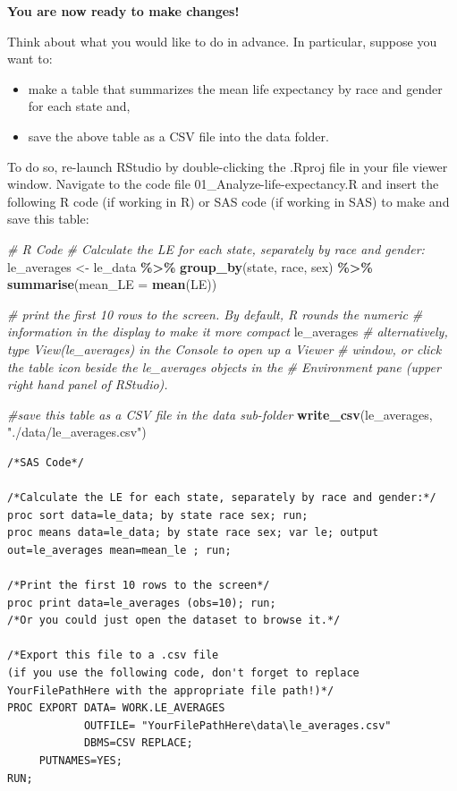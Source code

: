 \documentclass[
]{book}
\newenvironment{Shaded}{\begin{snugshade}}{\end{snugshade}}
\newcommand{\AttributeTok}[1]{\textcolor[rgb]{0.13,0.29,0.53}{#1}}
\newcommand{\CommentTok}[1]{\textcolor[rgb]{0.56,0.35,0.01}{\textit{#1}}}
\newcommand{\FunctionTok}[1]{\textcolor[rgb]{0.13,0.29,0.53}{\textbf{#1}}}
\newcommand{\NormalTok}[1]{#1}
\newcommand{\OtherTok}[1]{\textcolor[rgb]{0.56,0.35,0.01}{#1}}
\newcommand{\SpecialCharTok}[1]{\textcolor[rgb]{0.81,0.36,0.00}{\textbf{#1}}}
\newcommand{\StringTok}[1]{\textcolor[rgb]{0.31,0.60,0.02}{#1}}
\providecommand{\tightlist}{%
  \setlength{\itemsep}{0pt}\setlength{\parskip}{0pt}}
\begin{document}
\textbf{You are now ready to make changes!}

Think about what you would like to do in advance. In particular, suppose you
want to:

\begin{itemize}
\tightlist
\item
  make a table that summarizes the mean life expectancy by race and
  gender for each state and,
\item
  save the above table as a CSV file into the data folder.
\end{itemize}

To do so, re-launch RStudio by double-clicking the .Rproj file in your file viewer
window. Navigate to the code file 01\_Analyze-life-expectancy.R and insert the
following R code (if working in R) or SAS code (if working in SAS) to make and save this table:

\begin{Shaded}
\begin{Highlighting}[]
\CommentTok{\# R Code}
\CommentTok{\# Calculate the LE for each state, separately by race and gender:}
\NormalTok{le\_averages }\OtherTok{\textless{}{-}}\NormalTok{ le\_data }\SpecialCharTok{\%\textgreater{}\%} 
  \FunctionTok{group\_by}\NormalTok{(state, race, sex) }\SpecialCharTok{\%\textgreater{}\%}
  \FunctionTok{summarise}\NormalTok{(}\AttributeTok{mean\_LE =} \FunctionTok{mean}\NormalTok{(LE)) }

\CommentTok{\# print the first 10 rows to the screen. By default, R rounds the numeric }
\CommentTok{\# information in the display to make it more compact }
\NormalTok{le\_averages}
\CommentTok{\# alternatively, type View(le\_averages) in the Console to open up a Viewer }
\CommentTok{\# window, or click the table icon beside the le\_averages objects in the }
\CommentTok{\# Environment pane (upper right hand panel of RStudio).}

\CommentTok{\#save this table as a CSV file in the data sub{-}folder}
\FunctionTok{write\_csv}\NormalTok{(le\_averages, }\StringTok{"./data/le\_averages.csv"}\NormalTok{)}
\end{Highlighting}
\end{Shaded}

\begin{verbatim}
/*SAS Code*/

/*Calculate the LE for each state, separately by race and gender:*/
proc sort data=le_data; by state race sex; run;
proc means data=le_data; by state race sex; var le; output out=le_averages mean=mean_le ; run;

/*Print the first 10 rows to the screen*/
proc print data=le_averages (obs=10); run;
/*Or you could just open the dataset to browse it.*/

/*Export this file to a .csv file 
(if you use the following code, don't forget to replace YourFilePathHere with the appropriate file path!)*/
PROC EXPORT DATA= WORK.LE_AVERAGES 
            OUTFILE= "YourFilePathHere\data\le_averages.csv" 
            DBMS=CSV REPLACE;
     PUTNAMES=YES;
RUN;
\end{verbatim}
\end{document}
